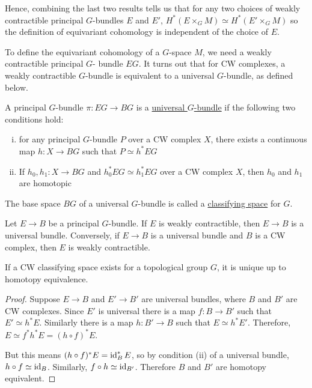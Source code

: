 Hence, combining the last two results tells us that for any two choices of
weakly contractible principal $G$-bundles  $E$ and  $E'$,  $H^*(E\times_G M)
\simeq H^*(E'\times_G M)$ so the definition of equivariant cohomology is
independent of the choice of  $E$. 

To define the equivariant cohomology of a $G$-space  $M$, we need a weakly
contractible principal $G$- bundle $EG$. It turns out that for CW complexes,  
a weakly contractible $G$-bundle is equivalent to a universal $G$-bundle, as
defined below.
\begin{defn}
	A principal $G$-bundle  $\pi:EG\to BG$ is a \underline{universal $G$-bundle} 
	if the following two conditions hold:
	\begin{enumerate}[(i)]
	    \item for any principal $G$-bundle  $P$ over a CW complex $X$, there
			exists a continuous map  $h:X\to BG$ such that  $P \simeq h^*EG$ 
		\item If $h_0,h_1:X\to BG$ and $h_0^*EG \simeq h_1^*EG$ over a CW
			complex $X$, then  $h_0$ and $h_1$ are homotopic
	\end{enumerate}
	The base space $BG$ of a universal  $G$-bundle is called a
	\underline{classifying space} for  $G$.
\end{defn}
\begin{thm}[Steenrod 1951] %
	Let $E\to B$ be a principal  $G$-bundle. If  $E$ is weakly contractible,
	then  $E\to B$ is a universal bundle. Conversely, if  $E\to B$ is a
	universal bundle and  $B$ is a CW complex, then  $E$ is weakly contractible.
\end{thm}

\begin{comment}
Let $X$ be a CW complex, and $[X,B]$ be the homotopy classes of maps $h:X\to B$, 
and  $\mathcal{P}_G(X)$ be the isomorphism classes of principal $G$-bundles over $X$. 
Then the definition of universal $G$-bundle states the map
$\varphi:[X,BG]\to\mathcal{P}_G(X)$ given by $h\mapsto h^*(EG)$ is surjective
(condition (i)) and injective (condition (ii)). 
\end{comment}

\begin{thm} %
	If a CW classifying space exists for a topological group $G$, it is unique 
	up to homotopy equivalence.
\end{thm}
\begin{proof}
	Suppose $E\to B$ and  $E'\to B'$ are universal bundles, where $B$ and  $B'$
	are CW complexes. Since  $E'$ is
	universal there is a map  $f:B\to B'$ such that  $E'\simeq h^*E$. Similarly
	there is a map  $h:B'\to B$ such that  $E\simeq h^*E'$. Therefore,  $E\simeq
	f^*h^*E=(h\circ f)^*E$. 

	But this means  $(h\circ f)^*E = \operatorname{id}_B^*E$, so by condition (ii) of a
	universal bundle, $h\circ f \simeq \operatorname{id}_B$. Similarly, $f\circ h\simeq
	\operatorname{id}_{B'}$. Therefore $B$ and  $B'$ are homotopy equivalent.
\end{proof}

